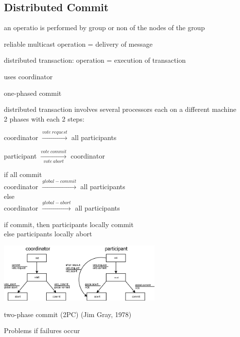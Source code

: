 \subsection{Distributed Commit}
\begin{compactitem}
	\item an operatio is performed by group or non of the nodes of the group
	\item reliable multicast operation = delivery of message
	\item distributed transaction: operation = execution of transaction
	\item uses coordinator
	\item one-phased commit
	\begin{compactitem}
	\item distributed transaction involves several processors each on a different machine\\
	2 phases with each 2 steps:\\
	\begin{compactenum}
		\item coordinator $\xrightarrow{vote\ request}$ all participants
		\item participant $\xrightarrow[vote\ abort]{vote\ commit}$ coordinator
		\item if all commit\\
		coordinator $\xrightarrow{global-commit}$ all participants\\
		else\\
		coordinator $\xrightarrow{global-abort}$ all participants\\
		\item if commit, then participants locally commit\\
		else participants locally abort\\
			\begin{minipage}{\linewidth}
			\centering\includegraphics[width=310px]{gfx/2pc.png}
			\label{img:2pc}
			\end{minipage}
		\item two-phase commit (2PC) (Jim Gray, 1978)
	\end{compactenum}
	Problems if failures occur\\

\end{compactitem}
\end{compactitem}
